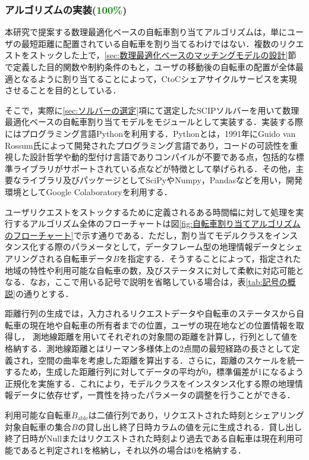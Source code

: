       \subsubsection{アルゴリズムの実装(\textcolor{green}{100\%})}
        \label{sec:アルゴリズムの実装}
          \par 本研究で提案する数理最適化ベースの自転車割り当てアルゴリズムは，単にユーザの最短距離に配置されている自転車を割り当てるわけではない．複数のリクエストをストックした上で，\ref{sec:数理最適化ベースのマッチングモデルの設計}節で定義した目的関数や制約条件のもと，ユーザの移動後の自転車の配置が全体最適となるように割り当てることによって，CtoCシェアサイクルサービスを実現させることを目的としている．
          \par そこで，実際に\ref{sec:ソルバーの選定}項にて選定したSCIPソルバーを用いて数理最適化ベースの自転車割り当てモデルをモジュールとして実装する．実装する際にはプログラミング言語Pythonを利用する．Pythonとは，1991年にGuido van Rossum氏によって開発されたプログラミング言語であり，コードの可読性を重視した設計哲学や動的型付け言語でありコンパイルが不要である点，包括的な標準ライブラリがサポートされている点などが特徴として挙げられる．その他，主要なライブラリ及びパッケージとしてSciPyやNumpy，Pandasなどを用い，開発環境としてGoogle Colaboratoryを利用する．
          \par ユーザリクエストをストックするために定義されるある時間幅に対して処理を実行するアルゴリズム全体のフローチャートは図\ref{fig:自転車割り当てアルゴリズムのフローチャート}で示す通りである．ただし，割り当てモデルクラスをインスタンス化する際のパラメータとして，データフレーム型の地理情報データとシェアリングされる自転車データ$B$を指定する．そうすることによって，指定された地域の特性や利用可能な自転車の数，及びステータスに対して柔軟に対応可能となる．なお，ここで用いる記号で説明を省略している場合は，表\ref{tab:記号の概説}の通りとする．
          \par 距離行列の生成では，入力されるリクエストデータや自転車のステータスから自転車の現在地や自転車の所有者までの位置，ユーザの現在地などの位置情報を取得し， 測地線距離を用いてそれぞれの対象間の距離を計算し，行列として値を格納する．測地線距離とはリーマン多様体上の2点間の最短経路の長さとして定義され，空間の曲率を考慮した距離を算出する．さらに，距離のスケールを統一するため，生成した距離行列に対してデータの平均が0，標準偏差が1になるよう正規化を実施する．これにより，モデルクラスをインスタンス化する際の地理情報データに依存せず，一貫性を持ったパラメータの調整を行うことができる．
          \par 利用可能な自転車$B_{\text{able}}$は二値行列であり，リクエストされた時刻とシェアリング対象自転車の集合$B$の貸し出し終了日時カラムの値を元に生成される．貸し出し終了日時がNullまたはリクエストされた時刻より過去である自転車は現在利用可能であると判定され1を格納し，それ以外の場合は0を格納する．
